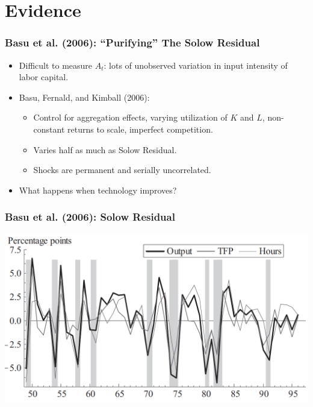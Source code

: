 \documentclass[english,xcolor=svgnames]{beamer}
\begin{document}
\section{Evidence}


\begin{frame}
\frametitle{Basu et al. (2006): ``Purifying'' The Solow Residual}
\begin{itemize}
	\item Difficult to measure $A_t$: lots of unobserved variation in input intensity of labor capital.
	\item Basu, Fernald, and Kimball (2006):
	\begin{itemize}
		\item Control for aggregation effects, varying utilization of $K$ and $L$, non-constant returns to scale, imperfect competition.
		\item Varies half as much as Solow Residual.
		\item Shocks are permanent and serially uncorrelated.
	\end{itemize}
	\item What happens when technology improves?
\end{itemize}
\end{frame}


\begin{frame}
\frametitle{Basu et al. (2006): Solow Residual}
\centering
\includegraphics[scale=0.6]{../../Images/BFK2006TFP.png}	
\end{frame}
\end{document}
